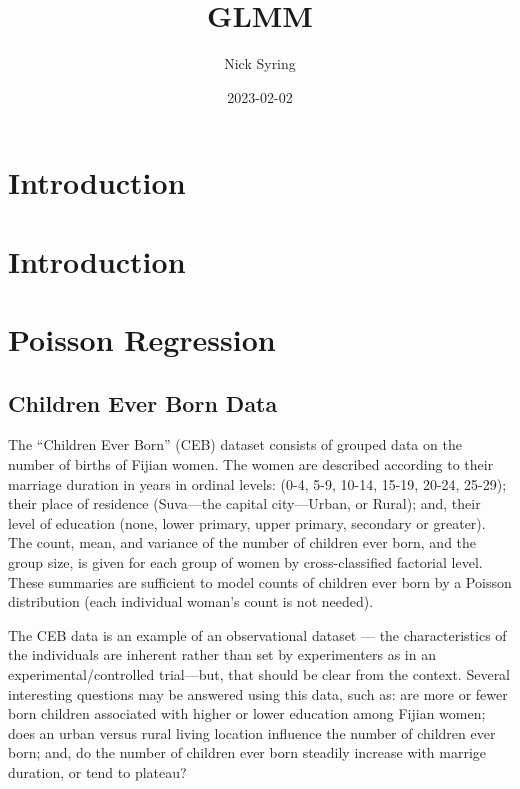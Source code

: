 \documentclass[
]{book}
\title{GLMM}
\author{Nick Syring}
\date{2023-02-02}
\begin{document}
\maketitle

{
\setcounter{tocdepth}{1}
\tableofcontents
}
\hypertarget{introduction}{%
\chapter{Introduction}\label{introduction}}

\hypertarget{intro}{%
\chapter{Introduction}\label{intro}}

\hypertarget{poisson-regression}{%
\chapter{Poisson Regression}\label{poisson-regression}}

\hypertarget{children-ever-born-data}{%
\section{Children Ever Born Data}\label{children-ever-born-data}}

The ``Children Ever Born'' (CEB) dataset consists of grouped data on the number of births of Fijian women. The women are described according to their marriage duration in years in ordinal levels: (0-4, 5-9, 10-14, 15-19, 20-24, 25-29); their place of residence (Suva---the capital city---Urban, or Rural); and, their level of education (none, lower primary, upper primary, secondary or greater). The count, mean, and variance of the number of children ever born, and the group size, is given for each group of women by cross-classified factorial level. These summaries are sufficient to model counts of children ever born by a Poisson distribution (each individual woman's count is not needed).

The CEB data is an example of an observational dataset --- the characteristics of the individuals are inherent rather than set by experimenters as in an experimental/controlled trial---but, that should be clear from the context. Several interesting questions may be answered using this data, such as: are more or fewer born children associated with higher or lower education among Fijian women; does an urban versus rural living location influence the number of children ever born; and, do the number of children ever born steadily increase with marrige duration, or tend to plateau?
\end{document}
